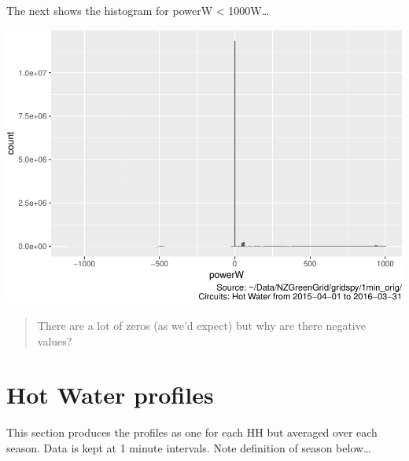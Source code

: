 \documentclass[]{article}
\begin{document}
The next shows the histogram for powerW \textless{} 1000W\ldots{}

\includegraphics{ggHotWaterProfiles_files/figure-latex/histo power under 1000-1.pdf}

\begin{quote}
There are a lot of zeros (as we'd expect) but why are there negative
values?
\end{quote}

\section{Hot Water profiles}\label{hot-water-profiles}

This section produces the profiles as one for each HH but averaged over
each season. Data is kept at 1 minute intervals. Note definition of
season below\ldots{}
\end{document}

